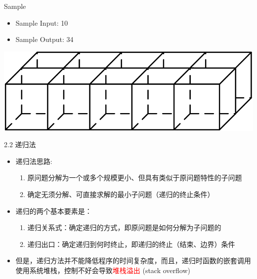\begin{frame}
    \begin{exampleblock}{Sample}
        \begin{itemize}
            \item Sample Input: 10
            \item Sample Output: 34
        \end{itemize}
    \end{exampleblock}
    \vfill
    \includegraphics[width=\textwidth]{fig/2-1.png}
\end{frame}
\begin{frame}{2.2 递归法}
    \begin{itemize}
        \item 递归法思路:
        \begin{enumerate}
            \item 原问题分解为一个或多个规模更小、但具有类似于原问题特性的子问题
            \item 确定无须分解、可直接求解的最小子问题（递归的终止条件）
        \end{enumerate}
        \item 递归的两个基本要素是：
        \begin{enumerate}
            \item 递归关系式：确定递归的方式，即原问题是如何分解为子问题的
            \item 递归出口：确定递归到何时终止，即递归的终止（结束、边界）条件
        \end{enumerate}
        \item 但是，递归方法并不能降低程序的时间复杂度，而且，递归时函数的嵌套调用使用系统堆栈，控制不好会导致\textcolor{red}{堆栈溢出} (stack overflow)
    \end{itemize}
\end{frame}
